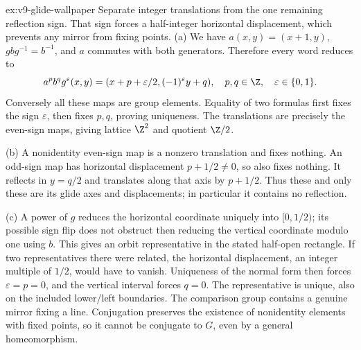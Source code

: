 \begin{solution}{ex:v9-glide-wallpaper}
\idea Separate integer translations from the one remaining reflection sign. That sign forces a half-integer horizontal displacement, which prevents any mirror from fixing points.
\writeup (a) We have $a(x,y)=(x+1,y)$, $gbg^{-1}=b^{-1}$, and $a$ commutes with both generators. Therefore every word reduces to
\[
a^pb^qg^\varepsilon(x,y)=
(x+p+\varepsilon/2,(-1)^\varepsilon y+q),
\quad p,q\in\Z,\quad\varepsilon\in\{0,1\}.
\]
Conversely all these maps are group elements. Equality of two formulas first fixes the sign $\varepsilon$, then fixes $p,q$, proving uniqueness. The translations are precisely the even-sign maps, giving lattice $\Z^2$ and quotient $\Z/2$.

(b) A nonidentity even-sign map is a nonzero translation and fixes nothing. An odd-sign map has horizontal displacement $p+1/2\ne0$, so also fixes nothing. It reflects in $y=q/2$ and translates along that axis by $p+1/2$. Thus these and only these are its glide axes and displacements; in particular it contains no reflection.

(c) A power of $g$ reduces the horizontal coordinate uniquely into $[0,1/2)$; its possible sign flip does not obstruct then reducing the vertical coordinate modulo one using $b$. This gives an orbit representative in the stated half-open rectangle. If two representatives there were related, the horizontal displacement, an integer multiple of $1/2$, would have to vanish. Uniqueness of the normal form then forces $\varepsilon=p=0$, and the vertical interval forces $q=0$. The representative is unique, also on the included lower/left boundaries. The comparison group contains a genuine mirror fixing a line. Conjugation preserves the existence of nonidentity elements with fixed points, so it cannot be conjugate to $G$, even by a general homeomorphism.
\end{solution}

